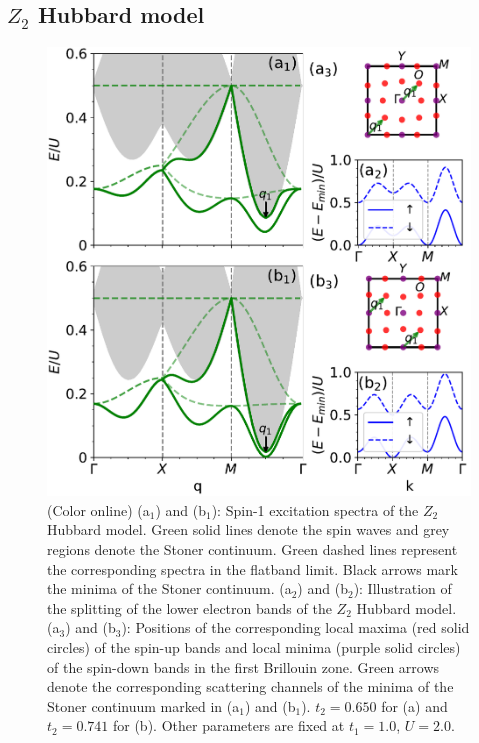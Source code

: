 \documentclass[amsmath,superscriptaddress,showpacs,aps,prb,twocolumn]{revtex4-1}
\begin{document}
\subsection{$Z_2$ Hubbard model}\label{ZHM}
\begin{figure}
\includegraphics[width=\columnwidth]{tispectrum}
\caption{(Color online) (a$_1$) and (b$_1$): Spin-1 excitation spectra of the $Z_2$ Hubbard model. Green solid lines denote the spin waves and grey regions denote the Stoner continuum. Green dashed lines represent the corresponding spectra in the flatband limit. Black arrows mark the minima of the Stoner continuum. (a$_2$) and (b$_2$): Illustration of the splitting of the lower electron bands of the $Z_2$ Hubbard model. (a$_3$) and (b$_3$): Positions of the corresponding local maxima (red solid circles) of the spin-up bands and local minima (purple solid circles) of the spin-down bands in the first Brillouin zone. Green arrows denote the corresponding scattering channels of the minima of the Stoner continuum marked in (a$_1$) and (b$_1$). $t_2=0.650$ for (a) and $t_2=0.741$ for (b). Other parameters are fixed at $t_1=1.0$, $U=2.0$.}
\label{tispectrum}
\end{figure}
\end{document}
